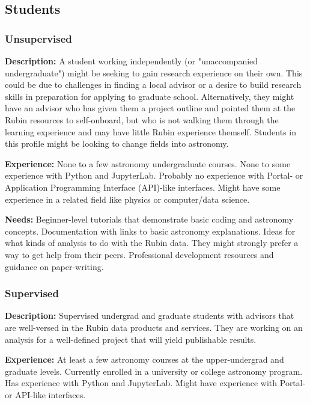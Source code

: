 \subsection{Students}

\subsubsection{Unsupervised}

\textbf{Description:} 
A student working independently (or "unaccompanied undergraduate") might be seeking to gain research experience on their own. This could be due to challenges in finding a local advisor or a desire to build research skills in preparation for applying to graduate school.
Alternatively, they might have an advisor who has given them a project outline and pointed
them at the Rubin resources to self-onboard, but who is not walking them through
the learning experience and may have little Rubin experience themself.
Students in this profile might be looking to change fields into astronomy.

\textbf{Experience:}
None to a few astronomy undergraduate courses.
None to some experience with Python and JupyterLab.
Probably no experience with Portal- or Application Programming Interface (API)-like interfaces.
Might have some experience in a related field like physics or computer/data science.

\textbf{Needs:}
Beginner-level tutorials that demonstrate basic coding and astronomy concepts.
Documentation with links to basic astronomy explanations.
Ideas for what kinds of analysis to do with the Rubin data.
They might strongly prefer a way to get help from their peers.
Professional development resources and guidance on paper-writing.

\subsubsection{Supervised}

\textbf{Description:} 
Supervised undergrad and graduate students with advisors that are well-versed
in the Rubin data products and services.
They are working on an analysis for a well-defined project that will yield publishable results.

\textbf{Experience:} 
At least a few astronomy courses at the upper-undergrad and graduate levels.
Currently enrolled in a university or college astronomy program.
Has experience with Python and JupyterLab.
Might have experience with Portal- or API-like interfaces.

